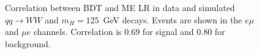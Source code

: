 \begin{figure}[!hbtp]
\centering
{}
\caption{Correlation between BDT and ME LR in data
and simulated $qq\rightarrow WW$ and $m_{H}=125$~GeV decays.
Events are shown in the $e\mu$ and $\mu e$ channels. Correlation is $0.69$ for signal and $0.80$ for background.}
\label{fig:me_correlations_of}
\end{figure}


\clearpage

